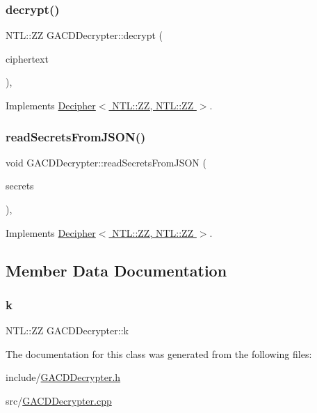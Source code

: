 \subsubsection{\texorpdfstring{decrypt()}{decrypt()}}
{\footnotesize\ttfamily N\+T\+L\+::\+ZZ G\+A\+C\+D\+Decrypter\+::decrypt (\begin{DoxyParamCaption}\item[{N\+T\+L\+::\+ZZ \&}]{ciphertext }\end{DoxyParamCaption})\hspace{0.3cm}{\ttfamily [override]}, {\ttfamily [virtual]}}



Implements \hyperlink{classDecipher_ac6b8c369eda2d7e17fa90cb594cf41b6}{Decipher$<$ N\+T\+L\+::\+Z\+Z, N\+T\+L\+::\+Z\+Z $>$}.

\mbox{\label{classGACDDecrypter_a7634cc069e61c1a3cf2443fed7c2b15f}} 
\subsubsection{\texorpdfstring{read\+Secrets\+From\+J\+S\+O\+N()}{readSecretsFromJSON()}}
{\footnotesize\ttfamily void G\+A\+C\+D\+Decrypter\+::read\+Secrets\+From\+J\+S\+ON (\begin{DoxyParamCaption}\item[{std\+::string \&}]{secrets }\end{DoxyParamCaption})\hspace{0.3cm}{\ttfamily [override]}, {\ttfamily [virtual]}}



Implements \hyperlink{classDecipher_a39aea002012130201e12a8fa7d84dda5}{Decipher$<$ N\+T\+L\+::\+Z\+Z, N\+T\+L\+::\+Z\+Z $>$}.



\subsection{Member Data Documentation}
\mbox{\label{classGACDDecrypter_add375694b9dd663ac42f6244f4d8ea53}} 
\subsubsection{\texorpdfstring{k}{k}}
{\footnotesize\ttfamily N\+T\+L\+::\+ZZ G\+A\+C\+D\+Decrypter\+::k\hspace{0.3cm}{\ttfamily [private]}}



The documentation for this class was generated from the following files\+:\begin{DoxyCompactItemize}
\item 
include/\hyperlink{GACDDecrypter_8h}{G\+A\+C\+D\+Decrypter.\+h}\item 
src/\hyperlink{GACDDecrypter_8cpp}{G\+A\+C\+D\+Decrypter.\+cpp}\end{DoxyCompactItemize}
